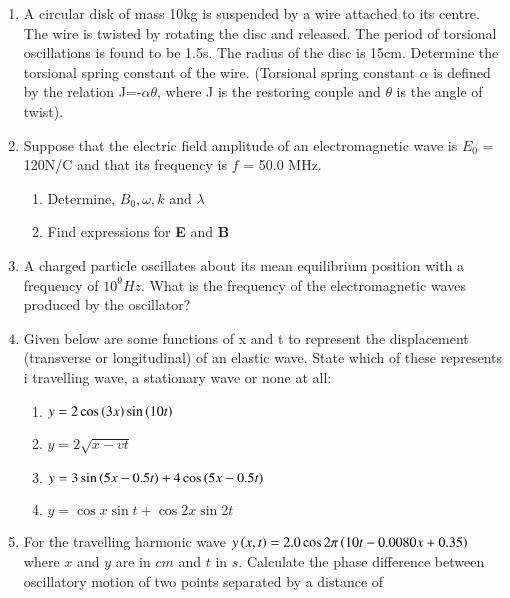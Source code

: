 \begin{enumerate}[label=\thesection.\arabic*,ref=\thesection.\theenumi]
\item A circular disk of mass 10kg is suspended by a wire attached to its centre. The wire is twisted by rotating the disc and released. The period of torsional oscillations is found to be 1.5s. The radius of the disc is 15cm. Determine the torsional spring constant of the wire. (Torsional spring constant $\alpha$ is defined by the relation J=-$\alpha$$\theta$, where J is the restoring couple and $\theta$ is the angle of twist).\\
\solution

\pagebreak
\item Suppose that the electric field amplitude of an electromagnetic wave is $E_0$ = 120N/C and that its frequency is $f$ = 50.0 MHz.
\begin{enumerate} [label=(\alph*)]
    \item Determine, $B_0, \omega, k$ and $\lambda$
    \item Find expressions for \textbf{E} and \textbf{B}
\end{enumerate}
\solution


\pagebreak
\item A charged particle oscillates about its mean equilibrium position with a frequency of $10^9Hz$. What is the frequency of the electromagnetic waves produced by the oscillator? \\
\solution

\pagebreak
\item Given below are some functions of x and t to 
represent the displacement (transverse
or longitudinal) of an elastic wave. State which of these represents \brak i travelling
wave,  a stationary wave or  none at all: \\
\begin{enumerate}
\item $y = 2\cos \left(3x\right) \sin \left(10t\right)$
\item $y=2\sqrt{x-vt}$
\item $y = 3\sin \left(5x - 0.5t\right) + 4\cos \left(5x - 0.5t\right)$
\item $y = \cos x \sin t + \cos 2x \sin 2t$
\end{enumerate}
\solution


\pagebreak
\item For the travelling harmonic wave
$y\left(x, t\right) = 2.0 \cos 2\pi \left(10t - 0.0080 x + 0.35\right)$ where $x$ and $y$ are in $cm$ and $t$ in $s$. Calculate the phase difference between oscillatory
motion of two points separated by a distance of 


\end{enumerate}

